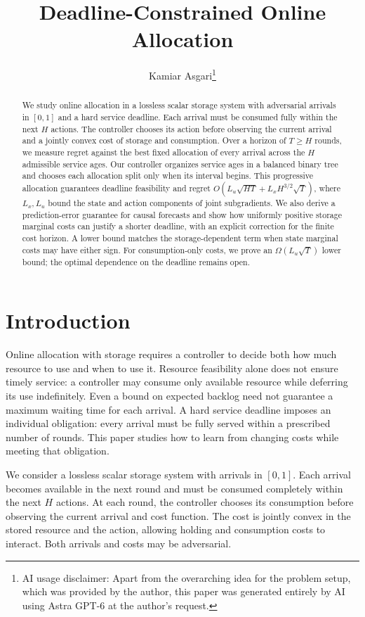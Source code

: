 \documentclass[11pt]{article}
\title{Deadline-Constrained Online Allocation}
\author{Kamiar Asgari\thanks{AI usage disclaimer: Apart from the overarching idea for the problem setup, which was provided by the author, this paper was generated entirely by AI using Astra GPT-6 at the author's request.}}
\date{}
\theoremstyle{plain}
\theoremstyle{remark}
\numberwithin{equation}{section}
\begin{document}
\maketitle

\begin{abstract}
We study online allocation in a lossless scalar storage system with
adversarial arrivals in $[0,1]$ and a hard service deadline. Each arrival
must be consumed fully within the next $H$ actions. The controller chooses
its action before observing the current arrival and a jointly convex cost
of storage and consumption. Over a horizon of $T\ge H$ rounds, we measure regret
against the best fixed allocation of every arrival across the $H$
admissible service ages. Our controller organizes service ages in a balanced
binary tree and chooses each allocation split only when its interval
begins. This progressive allocation guarantees deadline feasibility and
regret $O(L_u\sqrt{HT}+L_xH^{3/2}\sqrt T)$, where
$L_x,L_u$ bound the state and action components of
joint subgradients. We also derive a prediction-error guarantee for causal
forecasts and show how uniformly positive storage marginal costs can
justify a shorter deadline, with an explicit correction for the finite
cost horizon. A lower bound matches the storage-dependent term when state
marginal costs may have either sign. For consumption-only costs, we prove
an $\Omega(L_u\sqrt T)$ lower bound; the optimal dependence on the deadline
remains open.
\end{abstract}

\section{Introduction}
\label{ch6:sec:introduction}

Online allocation with storage requires a controller to decide both how
much resource to use and when to use it. Resource feasibility alone does
not ensure timely service: a controller may consume only available
resource while deferring its use indefinitely. Even a bound on expected
backlog need not guarantee a maximum waiting time for each arrival. A hard
service deadline imposes an individual obligation: every arrival must be
fully served within a prescribed number of rounds. This paper studies how
to learn from changing costs while meeting that obligation.

We consider a lossless scalar storage system with arrivals in $[0,1]$.
Each arrival becomes available in the next round and must be consumed
completely within the next $H$ actions. At each round, the controller
chooses its consumption before observing the current arrival and cost
function. The cost is jointly convex in the stored resource and the
action, allowing holding and consumption costs to interact. Both arrivals
and costs may be adversarial.
\end{document}
